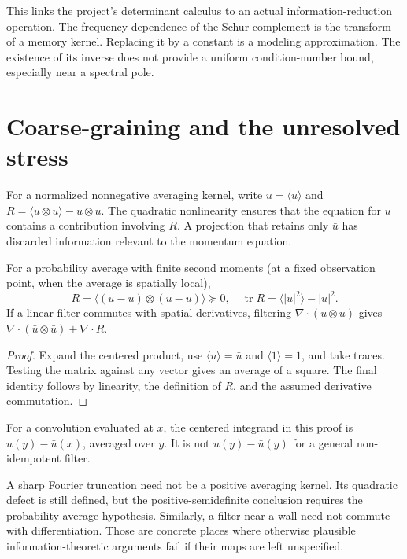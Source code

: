 This links the project's determinant calculus to an actual information-reduction operation. The frequency dependence of the Schur complement is the transform of a memory kernel. Replacing it by a constant is a modeling approximation. The existence of its inverse does not provide a uniform condition-number bound, especially near a spectral pole.

\section{Coarse-graining and the unresolved stress}

For a normalized nonnegative averaging kernel, write $\bar u=\langle u\rangle$ and
$R=\langle u\otimes u\rangle-\bar u\otimes\bar u$. The quadratic nonlinearity ensures that the equation for $\bar u$ contains a contribution involving $R$. A projection that retains only $\bar u$ has discarded information relevant to the momentum equation.

\begin{proposition}
\label{prop:fluid-filter-covariance}
For a probability average with finite second moments (at a fixed observation point, when the average is spatially local),
\[
 R=\langle(u-\bar u)\otimes(u-\bar u)\rangle\succeq0,
 \quad \operatorname{tr}R=\langle|u|^2\rangle-|\bar u|^2.
\]
If a linear filter commutes with spatial derivatives, filtering $\nabla\cdot(u\otimes u)$ gives
$\nabla\cdot(\bar u\otimes\bar u)+\nabla\cdot R$.
\end{proposition}
\begin{proof}
Expand the centered product, use $\langle u\rangle=\bar u$ and $\langle1\rangle=1$, and take traces. Testing the matrix against any vector gives an average of a square. The final identity follows by linearity, the definition of $R$, and the assumed derivative commutation.
\end{proof}

For a convolution evaluated at $x$, the centered integrand in this proof is $u(y)-\bar u(x)$, averaged over $y$. It is not $u(y)-\bar u(y)$ for a general non-idempotent filter.

A sharp Fourier truncation need not be a positive averaging kernel. Its quadratic defect is still defined, but the positive-semidefinite conclusion requires the probability-average hypothesis. Similarly, a filter near a wall need not commute with differentiation. Those are concrete places where otherwise plausible information-theoretic arguments fail if their maps are left unspecified.

